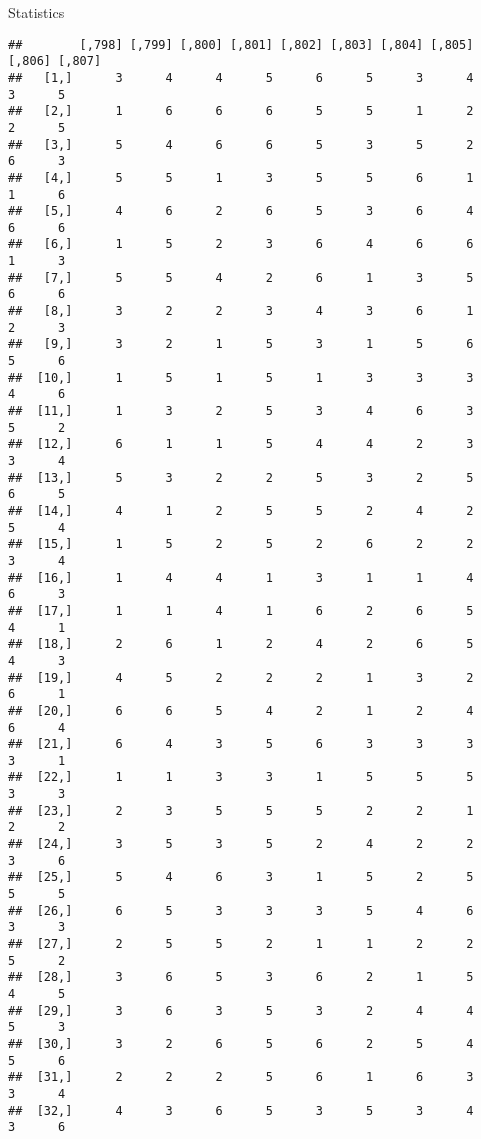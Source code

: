\documentclass[
  ignorenonframetext,
]{beamer}
\begin{document}
\begin{frame}[fragile]{Statistics}
\begin{verbatim}
##        [,798] [,799] [,800] [,801] [,802] [,803] [,804] [,805] [,806] [,807]
##   [1,]      3      4      4      5      6      5      3      4      3      5
##   [2,]      1      6      6      6      5      5      1      2      2      5
##   [3,]      5      4      6      6      5      3      5      2      6      3
##   [4,]      5      5      1      3      5      5      6      1      1      6
##   [5,]      4      6      2      6      5      3      6      4      6      6
##   [6,]      1      5      2      3      6      4      6      6      1      3
##   [7,]      5      5      4      2      6      1      3      5      6      6
##   [8,]      3      2      2      3      4      3      6      1      2      3
##   [9,]      3      2      1      5      3      1      5      6      5      6
##  [10,]      1      5      1      5      1      3      3      3      4      6
##  [11,]      1      3      2      5      3      4      6      3      5      2
##  [12,]      6      1      1      5      4      4      2      3      3      4
##  [13,]      5      3      2      2      5      3      2      5      6      5
##  [14,]      4      1      2      5      5      2      4      2      5      4
##  [15,]      1      5      2      5      2      6      2      2      3      4
##  [16,]      1      4      4      1      3      1      1      4      6      3
##  [17,]      1      1      4      1      6      2      6      5      4      1
##  [18,]      2      6      1      2      4      2      6      5      4      3
##  [19,]      4      5      2      2      2      1      3      2      6      1
##  [20,]      6      6      5      4      2      1      2      4      6      4
##  [21,]      6      4      3      5      6      3      3      3      3      1
##  [22,]      1      1      3      3      1      5      5      5      3      3
##  [23,]      2      3      5      5      5      2      2      1      2      2
##  [24,]      3      5      3      5      2      4      2      2      3      6
##  [25,]      5      4      6      3      1      5      2      5      5      5
##  [26,]      6      5      3      3      3      5      4      6      3      3
##  [27,]      2      5      5      2      1      1      2      2      5      2
##  [28,]      3      6      5      3      6      2      1      5      4      5
##  [29,]      3      6      3      5      3      2      4      4      5      3
##  [30,]      3      2      6      5      6      2      5      4      5      6
##  [31,]      2      2      2      5      6      1      6      3      3      4
##  [32,]      4      3      6      5      3      5      3      4      3      6

\end{verbatim}
\end{frame}
\end{document}
